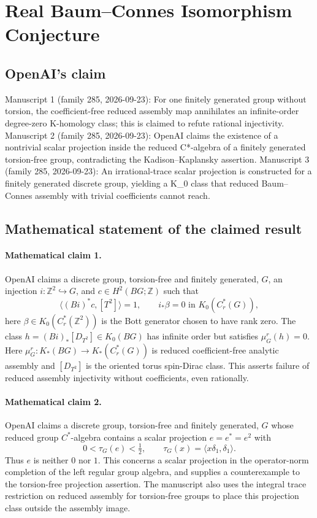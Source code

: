 \documentclass[11pt]{article}
\begin{document}
\section*{Real Baum–Connes Isomorphism Conjecture}

\subsection{OpenAI's claim}
Manuscript 1 (family 285, 2026-09-23): For one finitely generated group without torsion, the coefficient-free reduced assembly map annihilates an infinite-order degree-zero K-homology class; this is claimed to refute rational injectivity. Manuscript 2 (family 285, 2026-09-23): OpenAI claims the existence of a nontrivial scalar projection inside the reduced C*-algebra of a finitely generated torsion-free group, contradicting the Kadison--Kaplansky assertion. Manuscript 3 (family 285, 2026-09-23): An irrational-trace scalar projection is constructed for a finitely generated discrete group, yielding a K\_0 class that reduced Baum--Connes assembly with trivial coefficients cannot reach.

\subsection{Mathematical statement of the claimed result}
\paragraph{Mathematical claim 1.} OpenAI claims a discrete group, torsion-free and finitely generated, $G$, an injection $i:\mathbb Z^2\hookrightarrow G$, and $c\in H^2(BG;\mathbb Z)$ such that
\[
\langle(Bi)^*c,[T^2]\rangle=1,\qquad
 i_*\beta=0\text{ in }K_0(C_r^*(G)),
\]
here $\beta\in K_0(C_r^*(\mathbb Z^2))$ is the Bott generator chosen to have rank zero. The class $h=(Bi)_*[D_{T^2}]\in K_0(BG)$ has infinite order but satisfies $\mu_G^r(h)=0$. Here $\mu_G^r:K_*(BG)\to K_*(C_r^*(G))$ is reduced coefficient-free analytic assembly and $[D_{T^2}]$ is the oriented torus spin-Dirac class. This asserts failure of reduced assembly injectivity without coefficients, even rationally.

\paragraph{Mathematical claim 2.} OpenAI claims a discrete group, torsion-free and finitely generated, $G$ whose reduced group $C^*$-algebra contains a scalar projection $e=e^*=e^2$ with
\[
0<\tau_G(e)<\tfrac12,\qquad\tau_G(x)=\langle x\delta_1,\delta_1\rangle.
\]
Thus $e$ is neither $0$ nor $1$. This concerns a scalar projection in the operator-norm completion of the left regular group algebra, and supplies a counterexample to the torsion-free projection assertion. The manuscript also uses the integral trace restriction on reduced assembly for torsion-free groups to place this projection class outside the assembly image.
\end{document}
